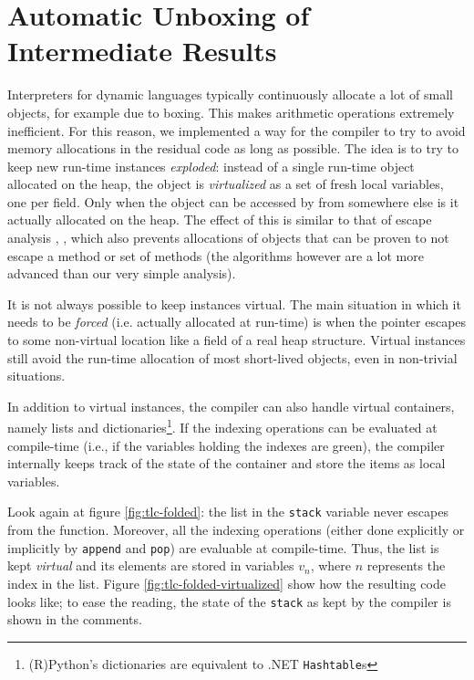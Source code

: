 \section{Automatic Unboxing of Intermediate Results}
\label{sec:virtuals}

Interpreters for dynamic languages typically continuously allocate a lot of small
objects, for example due to boxing. This makes arithmetic operations extremely
inefficient. For this reason, we
implemented a way for the compiler to try to avoid memory allocations in the
residual code as long as possible. The idea is to try to keep new
run-time instances \emph{exploded}: instead of a single run-time object allocated on
the heap, the object is \emph{virtualized} as a set
of fresh local variables, one per field. Only when the object can be accessed by from
somewhere else is it actually allocated on the heap. The effect of this is similar to that of
escape analysis \cite{Blanchet99escapeanalysis}, \cite{Choi99escapeanalysis},
which also prevents allocations of objects that can be proven to not escape a
method or set of methods (the algorithms however are a lot more advanced than
our very simple analysis).

It is not always possible to keep instances virtual.  The main
situation in which it needs to be \emph{forced} (i.e. actually allocated at
run-time) is when the pointer escapes to some non-virtual location like
a field of a real heap structure.  Virtual instances still avoid the run-time
 allocation of most short-lived objects, even in non-trivial situations.  

In addition to virtual instances, the compiler can also handle virtual
containers, namely lists and dictionaries\footnote{(R)Python's dictionaries
  are equivalent to .NET \lstinline{Hashtable}s}.  If the indexing operations
can be evaluated at compile-time (i.e., if the variables holding the indexes
are green), the compiler internally keeps track of the state of the container
and store the items as local variables.

Look again at figure \ref{fig:tlc-folded}: the list in the \lstinline{stack}
variable never escapes from the function.  Moreover, all the indexing
operations (either done explicitly or implicitly by \lstinline{append} and
\lstinline{pop}) are evaluable at compile-time.  Thus, the list is kept
\emph{virtual} and its elements are stored in variables $v_n$, where $n$
represents the index in the list.  Figure \ref{fig:tlc-folded-virtualized}
show how the resulting code looks like; to ease the reading, the state of the
\lstinline{stack} as kept by the compiler is shown in the comments.

